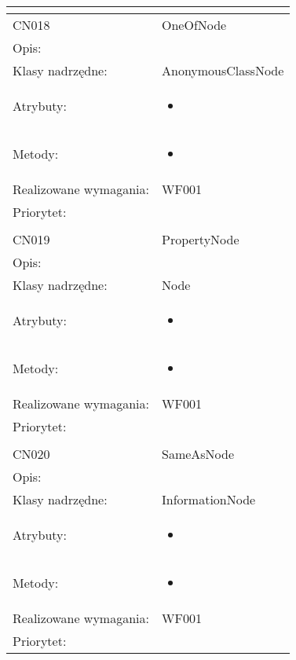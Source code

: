 \documentclass[a4paper,10pt]{article}
\begin{document}
\begin{center}
\begin{longtable}{|m{3cm}|m{9cm}|}
\multicolumn{2}{c}{} \\
 \hline

CN018 & OneOfNode \\ \hline
Opis: &     \\ \hline
Klasy nadrzędne: & AnonymousClassNode     \\ \hline
Atrybuty: & \begin{itemize}
 \item 
\end{itemize}
 \\ \hline
Metody: & \begin{itemize}
 \item 
\end{itemize}
  \\ \hline
Realizowane wymagania: & WF001 \\ \hline
Priorytet: &  \\ \hline

\multicolumn{2}{c}{} \\
 \hline

CN019 & PropertyNode \\ \hline
Opis: &     \\ \hline
Klasy nadrzędne: & Node     \\ \hline
Atrybuty: & \begin{itemize}
 \item 
\end{itemize}
 \\ \hline
Metody: & \begin{itemize}
 \item 
\end{itemize}
  \\ \hline
Realizowane wymagania: & WF001 \\ \hline
Priorytet: &  \\ \hline

\multicolumn{2}{c}{} \\
 \hline

CN020 & SameAsNode \\ \hline
Opis: &     \\ \hline
Klasy nadrzędne: & InformationNode     \\ \hline
Atrybuty: & \begin{itemize}
 \item 
\end{itemize}
 \\ \hline
Metody: & \begin{itemize}
 \item 
\end{itemize}
  \\ \hline
Realizowane wymagania: & WF001 \\ \hline
Priorytet: &  \\ \hline


\end{longtable}
\end{center}
\end{document}
